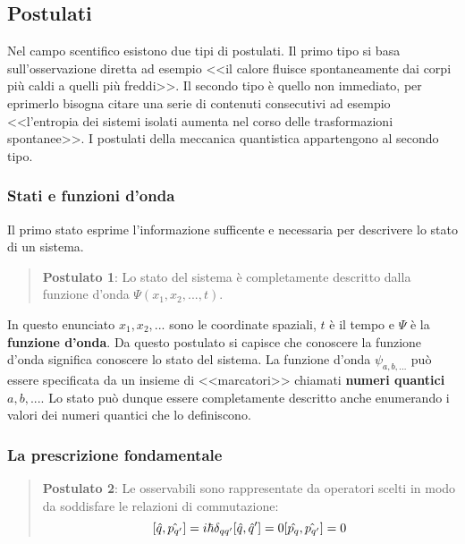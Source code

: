\subsection{Postulati}
Nel campo scentifico esistono due tipi di postulati. Il primo tipo si basa sull'osservazione diretta ad esempio <<il calore fluisce spontaneamente dai corpi più caldi a quelli più freddi>>. Il secondo tipo è quello non immediato, per eprimerlo bisogna citare una serie di contenuti consecutivi ad esempio <<l'entropia dei sistemi isolati aumenta nel corso delle trasformazioni spontanee>>. I postulati della meccanica quantistica appartengono al secondo tipo.

\subsubsection{Stati e funzioni d'onda}
Il primo stato esprime l'informazione sufficente e necessaria per descrivere lo stato di un sistema.
\begin{quote}
\textbf{Postulato 1}: Lo stato del sistema è completamente descritto dalla funzione d'onda $\Psi(x_1, x_2, ..., t)$.
\end{quote}
In questo enunciato $x_1, x_2, ...$ sono le coordinate spaziali, $t$ è il tempo e $\Psi$ è la \textbf{funzione d'onda}. Da questo postulato si capisce che conoscere la funzione d'onda significa conoscere lo stato del sistema. La funzione d'onda $\psi_{a, b, ...}$ può essere specificata da un insieme di <<marcatori>> chiamati \textbf{numeri quantici} $a, b, ...$. Lo stato può dunque essere completamente descritto anche enumerando i valori dei numeri quantici che lo definiscono.

\subsubsection{La prescrizione fondamentale}
\begin{quote}
\textbf{Postulato 2}: Le osservabili sono rappresentate da operatori scelti in modo da soddisfare le relazioni di commutazione:
$$[\hat{q}, \hat{p_{q'}}] = i \hbar \delta_{qq'} \hfill [\hat{q}, \hat{q}'] = 0 \hfill [\hat{p_q}, \hat{p_{q'}}] = 0 $$
\end{quote}

